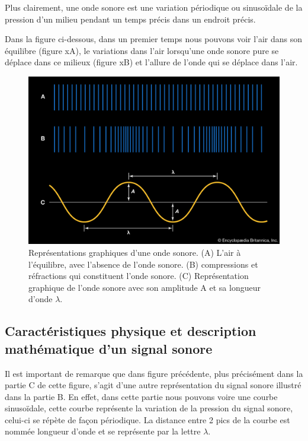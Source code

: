 \documentclass[conference,onecolumn]{IEEEtran}
\begin{document}
Plus clairement, une onde sonore est une variation périodique ou sinusoïdale de la pression d’un milieu pendant un temps précis dans un endroit précis. 

Dans la figure ci-dessous, dans un premier temps nous pouvons voir l’air dans son équilibre (figure xA), le variations dans l’air lorsqu’une onde sonore pure se déplace dans ce milieux (figure xB) et l’allure de  l’onde qui se déplace dans l’air.

\begin{figure}[H]
 \centering
    \includegraphics[scale=0.2]{img1.jpg}
    \caption{Représentations graphiques d’une onde sonore. (A) L’air à l’équilibre, avec l’absence de l’onde sonore. (B) compressions et réfractions qui constituent l’onde sonore. (C) Représentation graphique de l’onde sonore avec son amplitude A et sa longueur d’onde $\lambda$.}
\end{figure}

\subsection{Caractéristiques physique et description mathématique d’un signal sonore }

Il est important de remarque que dans figure précédente, plus précisément dans la partie C de cette figure, s’agit d’une autre représentation du signal sonore illustré dans la partie B. En effet, dans cette partie nous pouvons voire une courbe sinusoïdale, cette courbe représente la variation de la pression du signal sonore, celui-ci se répète de façon périodique. La distance entre 2 pics de la courbe est nommée longueur d’onde et se représente par la lettre $\lambda$. 
\end{document}
